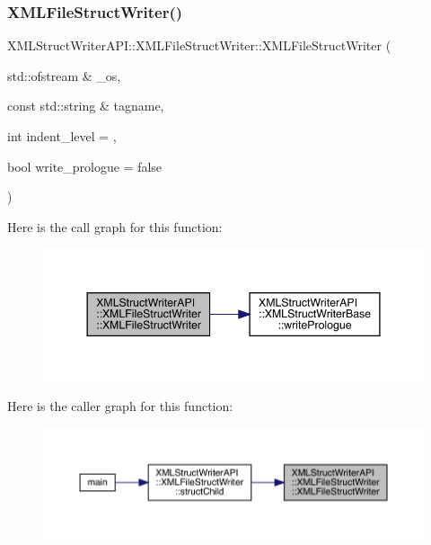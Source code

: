 \subsubsection{\texorpdfstring{XMLFileStructWriter()}{XMLFileStructWriter()}\hspace{0.1cm}{\footnotesize\ttfamily [1/3]}}
{\footnotesize\ttfamily X\+M\+L\+Struct\+Writer\+A\+P\+I\+::\+X\+M\+L\+File\+Struct\+Writer\+::\+X\+M\+L\+File\+Struct\+Writer (\begin{DoxyParamCaption}\item[{std\+::ofstream \&}]{\+\_\+os,  }\item[{const std\+::string \&}]{tagname,  }\item[{int}]{indent\+\_\+level = {},  }\item[{bool}]{write\+\_\+prologue = {\ttfamily false} }\end{DoxyParamCaption})\hspace{0.3cm}{\ttfamily [inline]}}

Here is the call graph for this function\+:
\nopagebreak
\begin{figure}[H]
\begin{center}
\leavevmode
\includegraphics[width=344pt]{db/de3/classXMLStructWriterAPI_1_1XMLFileStructWriter_a7045796a887cf66a8ee5a355a1f3c4a9_cgraph}
\end{center}
\end{figure}
Here is the caller graph for this function\+:
\nopagebreak
\begin{figure}[H]
\begin{center}
\leavevmode
\includegraphics[width=350pt]{db/de3/classXMLStructWriterAPI_1_1XMLFileStructWriter_a7045796a887cf66a8ee5a355a1f3c4a9_icgraph}
\end{center}
\end{figure}
\mbox{\label{classXMLStructWriterAPI_1_1XMLFileStructWriter_a28ac83ac02b6b4e4e67f9a767320155d}} 
